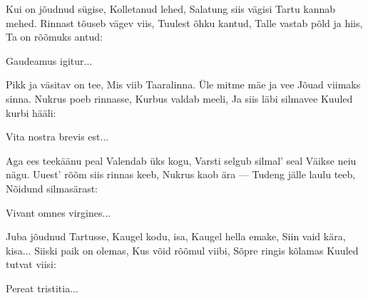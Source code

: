 

\beginverse*
Kui on jõudnud sügise,
Kolletanud lehed,
Salatung siis vägisi
Tartu kannab mehed.
Rinnast tõuseb vägev viis,
Tuulest õhku kantud,
Talle vastab põld ja hiis,
Ta on rõõmuks antud:

Gaudeamus igitur...
\endverse

\beginverse*
Pikk ja väsitav on tee,
Mis viib Taaralinna.
Üle mitme mäe ja vee
Jõuad viimaks sinna.
Nukrus poeb rinnasse,
Kurbus valdab meeli,
Ja siis läbi silmavee
Kuuled kurbi hääli:

Vita nostra brevis est...
\endverse

\beginverse*
Aga ees teekäänu peal
Valendab üks kogu,
Varsti selgub silmal’ seal
Väikse neiu nägu.
Uuest’ rõõm siis rinnas keeb,
Nukrus kaob ära —
Tudeng jälle laulu teeb,
Nõidund silmasärast:

Vivant omnes virgines...
\endverse

\beginverse*
Juba jõudnud Tartusse,
Kaugel kodu, isa,
Kaugel hella emake,
Siin vaid kära, kisa...
Siiski paik on olemas,
Kus võid rõõmul viibi,
Sõpre ringis kõlamas
Kuuled tutvat viisi:

Pereat tristitia...
\endverse
\endsong
